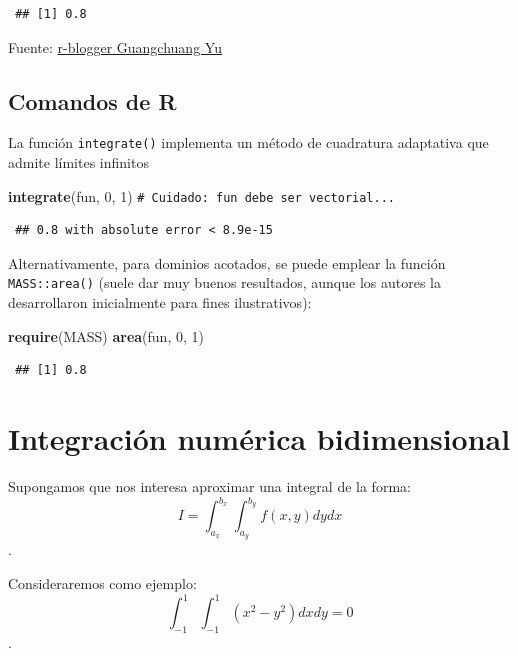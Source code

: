 \documentclass[
  spanish,
  10pt,
]{book}
\newenvironment{Shaded}{\begin{snugshade}}{\end{snugshade}}
\newcommand{\CommentTok}[1]{\textcolor[rgb]{0.56,0.35,0.01}{\textit{#1}}}
\newcommand{\DecValTok}[1]{\textcolor[rgb]{0.00,0.00,0.81}{#1}}
\newcommand{\FunctionTok}[1]{\textcolor[rgb]{0.13,0.29,0.53}{\textbf{#1}}}
\newcommand{\NormalTok}[1]{#1}
\theoremstyle{break}
\theoremstyle{nonumberplain}
\renewcommand{\CommentTok}[1]{\textcolor[rgb]{0.41,0.41,0.41}{\texttt{#1}}}
\begin{document}
\begin{verbatim}
 ## [1] 0.8
\end{verbatim}

Fuente: \href{https://www.r-bloggers.com/one-dimensional-integrals}{r-blogger Guangchuang Yu}

\subsection{Comandos de R}\label{comandos-de-r}

La función \texttt{integrate()} implementa un método de cuadratura adaptativa que admite límites infinitos

\begin{Shaded}
\begin{Highlighting}[]
\FunctionTok{integrate}\NormalTok{(fun, }\DecValTok{0}\NormalTok{, }\DecValTok{1}\NormalTok{)  }\CommentTok{\# Cuidado: fun debe ser vectorial...}
\end{Highlighting}
\end{Shaded}

\begin{verbatim}
 ## 0.8 with absolute error < 8.9e-15
\end{verbatim}

Alternativamente, para dominios acotados, se puede emplear la función \texttt{MASS::area()} (suele dar muy buenos resultados, aunque los autores la desarrollaron inicialmente para fines ilustrativos):

\begin{Shaded}
\begin{Highlighting}[]
\FunctionTok{require}\NormalTok{(MASS)}
\FunctionTok{area}\NormalTok{(fun, }\DecValTok{0}\NormalTok{, }\DecValTok{1}\NormalTok{)}
\end{Highlighting}
\end{Shaded}

\begin{verbatim}
 ## [1] 0.8
\end{verbatim}

\section{Integración numérica bidimensional}\label{integraciuxf3n-numuxe9rica-bidimensional}

Supongamos que nos interesa aproximar una integral de la forma:
\[I=\int_{a_x}^{b_x}\int_{a_y}^{b_y}f(x, y)dy dx\].

Consideraremos como ejemplo:
\[\int_{-1}^{1} \int_{-1}^{1} \left( x^2 - y^2 \right) dx dy = 0\].
\end{document}
